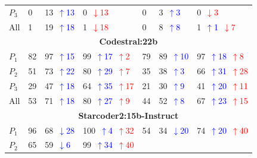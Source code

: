 \begin{table}
\begin{tabularx}{\textwidth}{l X X X X X X}
$P_3$ 
& 0 
& 13~\textcolor{blue}{\scriptsize$\uparrow$13}   
& 0~\textcolor{red}{\scriptsize$\downarrow$13}
& 0 
& 3~\textcolor{blue}{\scriptsize$\uparrow$3}   
& 0~\textcolor{red}{\scriptsize$\downarrow$3} \\
All 
& 1 
& 19~\textcolor{blue}{\scriptsize$\uparrow$18}   
& 1~\textcolor{red}{\scriptsize$\downarrow$18}
& 0 
& 8~\textcolor{blue}{\scriptsize$\uparrow$8}   
& 1~\textcolor{blue}{\scriptsize$\uparrow$1}~\textcolor{red}{\scriptsize$\downarrow$7} \\
\midrule
\multicolumn{7}{c}{\small\textbf{Codestral:22b}} \\
\midrule
$P_1$ 
& 82 
& 97~\textcolor{blue}{\scriptsize$\uparrow$15}   
& 99~\textcolor{blue}{\scriptsize$\uparrow$17}~\textcolor{red}{\scriptsize$\uparrow$2}
& 79 
& 89~\textcolor{blue}{\scriptsize$\uparrow$10}   
& 97~\textcolor{blue}{\scriptsize$\uparrow$18}~\textcolor{red}{\scriptsize$\uparrow$8} \\
$P_2$ 
& 51 
& 73~\textcolor{blue}{\scriptsize$\uparrow$22}   
& 80~\textcolor{blue}{\scriptsize$\uparrow$29}~\textcolor{red}{\scriptsize$\uparrow$7}
& 35 
& 38~\textcolor{blue}{\scriptsize$\uparrow$3}   
& 66~\textcolor{blue}{\scriptsize$\uparrow$31}~\textcolor{red}{\scriptsize$\uparrow$28} \\
$P_3$ 
& 29 
& 47~\textcolor{blue}{\scriptsize$\uparrow$18}   
& 64~\textcolor{blue}{\scriptsize$\uparrow$35}~\textcolor{red}{\scriptsize$\uparrow$17}
& 21 
& 30~\textcolor{blue}{\scriptsize$\uparrow$9}   
& 41~\textcolor{blue}{\scriptsize$\uparrow$20}~\textcolor{red}{\scriptsize$\uparrow$11} \\
All 
& 53 
& 71~\textcolor{blue}{\scriptsize$\uparrow$18}   
& 80~\textcolor{blue}{\scriptsize$\uparrow$27}~\textcolor{red}{\scriptsize$\uparrow$9}
& 44 
& 52~\textcolor{blue}{\scriptsize$\uparrow$8}   
& 67~\textcolor{blue}{\scriptsize$\uparrow$23}~\textcolor{red}{\scriptsize$\uparrow$15} \\
\midrule
\multicolumn{7}{c}{\small\textbf{Starcoder2:15b-Instruct}} \\
\midrule
$P_1$ 
& 96 
& 68~\textcolor{blue}{\scriptsize$\downarrow$28}   
& 100~\textcolor{blue}{\scriptsize$\uparrow$4}~\textcolor{red}{\scriptsize$\uparrow$32}
& 54 
& 34~\textcolor{blue}{\scriptsize$\downarrow$20}   
& 74~\textcolor{blue}{\scriptsize$\uparrow$20}~\textcolor{red}{\scriptsize$\uparrow$40} \\
$P_2$ 
& 65 
& 59~\textcolor{blue}{\scriptsize$\downarrow$6}   
& 99~\textcolor{blue}{\scriptsize$\uparrow$34}~\textcolor{red}{\scriptsize$\uparrow$40}

\end{tabularx}
\end{table}
